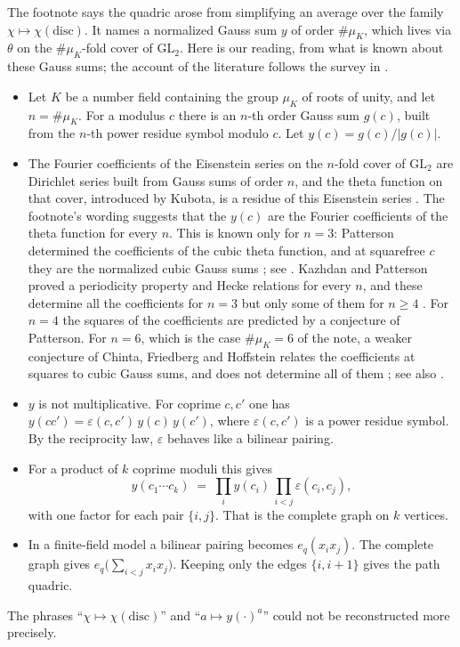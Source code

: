 \documentclass[11pt]{amsbook}
\theoremstyle{plain}
\theoremstyle{definition}
\theoremstyle{remark}
\numberwithin{equation}{section}
\numberwithin{figure}{chapter}
\numberwithin{table}{chapter}
\begin{document}
The footnote says the quadric arose from simplifying an average
over the family $\chi \mapsto \chi(\mathrm{disc})$. It names a
normalized Gauss sum $y$ of order $\#\mu_K$, which lives via
$\theta$ on the $\#\mu_K$-fold cover of $\mathrm{GL}_2$. Here is
our reading, from what is known about these Gauss sums; the
account of the literature follows the survey in
\cite[\S1]{BrokerHoffstein2013}.
\begin{itemize}
\item Let $K$ be a number field containing the group $\mu_K$ of
  roots of unity, and let $n = \#\mu_K$. For a modulus $c$ there is
  an $n$-th order Gauss sum $g(c)$, built from the $n$-th power
  residue symbol modulo $c$. Let $y(c) = g(c)/|g(c)|$.
\item The Fourier coefficients of the Eisenstein series on the
  $n$-fold cover of $\mathrm{GL}_2$ are Dirichlet series built from
  Gauss sums of order $n$, and the theta function on that cover,
  introduced by Kubota, is a residue of this Eisenstein series
  \cite[\S1, pp.~3--4]{BrokerHoffstein2013}. The footnote's wording
  suggests that the $y(c)$ are the Fourier coefficients of the
  theta function for every $n$. This is known only for $n=3$: Patterson
  determined the
  coefficients of the cubic theta function, and at squarefree $c$
  they are the normalized cubic Gauss sums \cite{Patterson1977};
  see \cite[\S1, p.~4]{BrokerHoffstein2013}. Kazhdan and Patterson
  \cite{KazhdanPatterson1984} proved a periodicity property and
  Hecke relations for every $n$, and these determine all the
  coefficients for $n=3$ but only some of them for $n\ge4$
  \cite[\S1, pp.~5--6]{BrokerHoffstein2013}. For $n=4$ the squares
  of the coefficients are predicted by a conjecture of Patterson.
  For $n=6$, which is the case $\#\mu_K=6$ of the note, a weaker
  conjecture of Chinta, Friedberg and Hoffstein
  \cite{ChintaFriedbergHoffstein2012} relates the coefficients at
  squares to cubic Gauss sums, and does not determine all of them
  \cite[\S1, pp.~6--8]{BrokerHoffstein2013}; see also
  \cite{Patterson2014}.
\item $y$ is not multiplicative. For coprime $c, c'$ one has
  $y(cc') = \varepsilon(c, c')\,y(c)\,y(c')$, where
  $\varepsilon(c, c')$ is a power residue symbol. By the
  reciprocity law, $\varepsilon$ behaves like a bilinear pairing.
\item For a product of $k$ coprime moduli this gives
  \[
    y(c_1\cdots c_k) \;=\; \prod_i y(c_i)\,
    \prod_{i<j}\varepsilon(c_i, c_j),
  \]
  with one factor for each pair $\{i, j\}$. That is the complete
  graph on $k$ vertices.
\item In a finite-field model a bilinear pairing becomes
  $e_q(x_ix_j)$. The complete graph gives
  $e_q\bigl(\sum_{i<j} x_ix_j\bigr)$. Keeping only the edges
  $\{i, i+1\}$ gives the path quadric.
\end{itemize}
The phrases ``$\chi \mapsto \chi(\mathrm{disc})$'' and
``$a \mapsto y(\cdot)^a$'' could not be reconstructed more
precisely.
\end{document}
